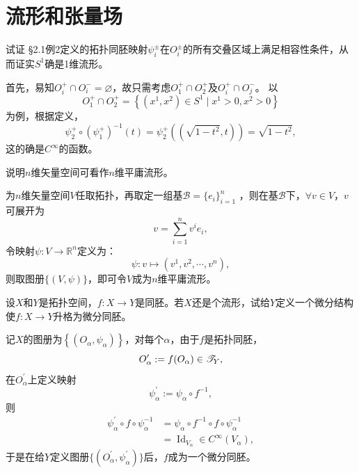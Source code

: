 \chapter{流形和张量场}
\begin{xiti}
	\item 试证 \S 2.1例2定义的拓扑同胚映射$\psi_i^{\pm}$在$O_i^{\pm}$的所有交叠区域上满足相容性条件，从而证实$S^1$确是1维流形。
	
	\begin{zm}
		首先，易知$O_i^+ \cap O_i^- =\varnothing$，故只需考虑$O_1^+\cap O_2^+ $及$O_i^+ \cap O_j^- $。
		以$$O_1^+ \cap O_2^+ =\left\lbrace \left(x^1,x^2\right)\in S^1 \mid x^1>0,x^2>0 \right\rbrace  $$为例，根据定义，
		\begin{equation*}
		\psi_2^+ \circ \left(\psi_1^+\right)^{-1}(t)=\psi_2^+\left(\left(\sqrt{1-t^2},t\right)\right)=\sqrt{1-t^2},
		\end{equation*}
		这的确是$C^\infty$的函数。
	\end{zm}

	\item 说明$n$维矢量空间可看作$n$维平庸流形。
	
	\begin{zm}
		为$n$维矢量空间$V$任取拓扑，再取定一组基$\mathcal{B}= \{ e_i \}_{i=1}^n $ ，则在基$\mathcal{B}$下，$\forall v \in V$，$v$可展开为
		\begin{equation*}
		v=\sum_{i=1}^{n} v^i e_i,
		\end{equation*}
		令映射$\psi \colon V\rightarrow \mathbb{R}^n$定义为：
		\begin{equation*}
		\psi\colon v\mapsto\left(v^1,v^2,\cdots,v^n\right),
		\end{equation*}
		则取图册$\{(V,\psi)\} $，即可令$V$成为$n$维平庸流形。
	\end{zm}

    \item 设$X$和$Y$是拓扑空间，$f\colon X\rightarrow Y$是同胚。若$X$还是个流形，试给$Y$定义一个微分结构使$f\colon X\rightarrow Y$升格为微分同胚。
    \begin{zm}
    	记$X$的图册为$\left\{ \left(O_\alpha,\psi_\alpha\right) \right\}$，对每个$\alpha$，由于$f$是拓扑同胚，$$O_{\alpha}^{\prime}:=f(O_{\alpha})\in \mathscr{T}_Y,$$在$O_\alpha^\prime$上定义映射$$\psi_\alpha^\prime:=\psi_\alpha\circ f^{-1},$$则
    	\begin{equation*}
    	\begin{split}
    	\psi_\alpha^{\prime}\circ f\circ \psi_\alpha^{-1} &=\psi_\alpha\circ f^{-1} \circ f \circ \psi_\alpha^{-1}\\
    	&=\operatorname{Id}_{V_\alpha}\in C^\infty(V_\alpha),
    	\end{split}
    	\end{equation*}
    	 于是在给$Y$定义图册$\{(O_\alpha^{\prime} ,\psi_\alpha^{\prime})\} $后，$f$成为一个微分同胚。
    \end{zm}


\end{xiti}
